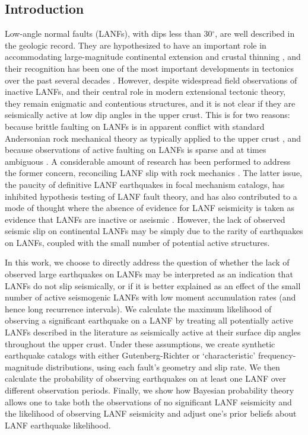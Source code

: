\documentclass[twocolumn,grl]{AGUTeX}
\begin{document}
\begin{article}

\section{Introduction}
Low-angle normal faults (LANFs), with dips less than 30$^\circ$, are
well described in the geologic record. They are hypothesized to have
an important role in accommodating large-magnitude continental
extension \citep{howard1987crustal} and crustal thinning
\citep{lister1986detachment}, and their recognition has been one of
the most important developments in tectonics over the past several
decades \citep{wernicke2009detachment}. However, despite widespread
field observations of inactive LANFs, and their central role in modern
extensional tectonic theory, they remain enigmatic and contentious
structures, and it is not clear if they are seismically active at low dip 
angles in the upper crust. This is for two reasons: because brittle faulting
on LANFs is in apparent conflict with standard Andersonian rock mechanical
theory as typically applied to the upper crust
\citep{axen2004lanfmech}, and because observations of active faulting
on LANFs is sparse and at times ambiguous \citep{wernicke1995seis}. A
considerable amount of research has been performed to address the
former concern, reconciling LANF slip with rock mechanics \citep [e.g.,]
[]{axenbartley1997, collettini2011lanfmech}. The latter issue, the paucity of 
definitive LANF earthquakes in focal mechanism catalogs, has inhibited
hypothesis testing of LANF fault theory, and has also contributed to a mode
of thought where the  absence of evidence for LANF seismicity is taken
as evidence that LANFs are inactive or aseismic \citep{jackson1987,
collettinisibson2001}. However, the lack of observed seismic slip on
continental LANFs may be simply due to the rarity of earthquakes on
LANFs, coupled with the small number of potential active structures.

In this work, we choose to directly address the question of whether
the lack of observed large earthquakes on LANFs may be 
interpreted as an indication that
LANFs do not slip seismically, or if it is better explained as an
effect of the small number of active seismogenic LANFs with low moment
accumulation rates (and hence long recurrence intervals). 
We calculate the maximum likelihood of observing a significant
earthquake on a LANF by treating all potentially active LANFs described in the 
literature as seismically active at their surface dip angles 
throughout the upper crust. %
Under these assumptions, we create synthetic earthquake catalogs with
either Gutenberg-Richter or `characteristic' frequency-magnitude distributions, 
using each fault's geometry and slip rate. We then calculate the
probability of observing earthquakes on at least one LANF over different
observation periods.
Finally, we show how Bayesian probability theory allows one to take
both the observations of no significant LANF seismicity and the likelihood
of observing LANF seismicity and adjust one's prior beliefs about LANF
earthquake likelihood.


\end{article}
\end{document}
